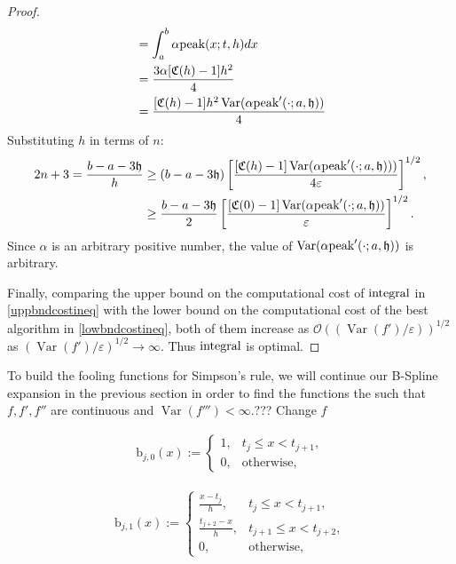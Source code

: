 \documentclass{iitthesis}
\DeclareMathOperator{\Var}{Var}
\theoremstyle{definition}
\theoremstyle{remark}
\begin{document}
\begin{proof}
\begin{subequations}
\begin{align*}
     &=\int_{a}^{b}\alpha\textup{peak}(x;t,h)dx\\
     &=\frac{3\alpha[\mathfrak{C}(h)-1]h^2}{4}\\
     &=\frac{[\mathfrak{C}(h)-1]h^2\Var(\alpha\textup{peak}'(\cdot;a,\mathfrak{h}))}{4}
  \end{align*}
  \end{subequations}
  Substituting $h$  in terms of $n$:
      \begin{align*}
        2n+3=\frac{b-a-3\mathfrak{h}}{h}&\ge(b-a-3\mathfrak{h})\left[\frac{[\mathfrak{C}(h)-1]\Var(\alpha \textup{peak}'(\cdot;a,\mathfrak{h})))}{4\varepsilon}\right]^{1/2},\\
        &\ge\frac{b-a-3\mathfrak{h}}{2}\left[\frac{[\mathfrak{C}(0)-1]\Var(\alpha \textup{peak}'(\cdot;a,\mathfrak{h}))}{\varepsilon}\right]^{1/2}.
    \end{align*}
    Since $\alpha$ is an arbitrary positive number, the value of $\Var(\alpha \textup{peak}'(\cdot;a,\mathfrak{h}))$ is arbitrary.

    Finally, comparing the upper bound on the computational cost of $\textup{integral}$ in \eqref{uppbndcostineq} with the lower bound on the computational cost of the best algorithm in \eqref{lowbndcostineq}, both of them increase as $\mathcal{O}((\Var(f')/\varepsilon))^{1/2}$ as $(\Var(f')/\varepsilon)^{1/2}\rightarrow \infty$. Thus $\textup{integral}$ is optimal.
\end{proof}


To build the fooling functions for Simpson's rule, we will continue our B-Spline expansion in the previous section in order to find the functions the such that $f,f',f''$ are continuous and $\Var(f''')<\infty$.??? Change $f$

\begin{align*}
  \text{b}_{j,0}(x):= \begin{cases} \displaystyle 1, & t_{j} \le x < t_{j+1},\\[1ex]
\displaystyle  0, & \text{otherwise},
\end{cases}
\end{align*}

\begin{align*}
  \text{b}_{j,1}(x):= \begin{cases} \displaystyle \frac{x-t_{j}}{h}, & t_{j} \le x < t_{j+1},\\[1ex]
\displaystyle \frac{t_{j+2}-x}{h}, & t_{j+1} \le x < t_{j+2},\\[1ex]
\displaystyle  0, & \text{otherwise},
\end{cases}
\end{align*}
\end{document}
